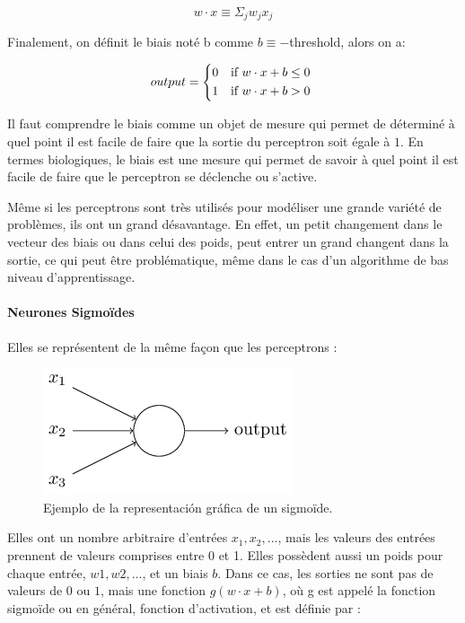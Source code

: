 \documentclass[conference,onecolumn]{IEEEtran}
\begin{document}
\begin{equation}
    w \cdot x \equiv \Sigma_j w_jx_j
\end{equation}

Finalement, on définit le biais noté b comme $b \equiv -$threshold, alors on a: 

\begin{equation}
    output =
    \begin{cases*}
      0 & if $w \cdot x + b \leq 0$ \\
      1 & if $w \cdot x + b > 0$ \\
    \end{cases*}
\end{equation}

Il faut comprendre le biais comme un objet de mesure qui permet de déterminé à quel point il est facile de faire que la sortie du perceptron soit égale à $1$. En termes biologiques, le biais est une mesure qui permet de savoir à quel point il est facile de faire que le perceptron se déclenche ou s’active. 

Même si les perceptrons sont très utilisés pour modéliser une grande variété de problèmes, ils ont un grand désavantage. En effet, un petit changement dans le vecteur des biais ou dans celui des poids, peut entrer un grand changent dans la sortie, ce qui peut être problématique, même dans le cas d’un algorithme de bas niveau d’apprentissage.
\hfill\\

\paragraph{Neurones Sigmoïdes}
Elles se représentent de la même façon que les perceptrons : 

 \begin{figure}[H]
 \centering
    \includegraphics[scale=0.5]{img9.png}
    \caption{Ejemplo de la representación gráfica de un sigmoïde.}
\end{figure}

Elles ont un nombre arbitraire d’entrées $x_1, x_2, ...$, mais les valeurs des entrées prennent de valeurs comprises entre 0 et 1. Elles possèdent aussi un poids pour chaque entrée, $w1, w2, ...$, et un biais $b$. Dans ce cas, les sorties ne sont pas de valeurs de $0$ ou $1$, mais une fonction $g(w\cdot x+b)$, où g est appelé la fonction sigmoïde ou en général, fonction d’activation, et est définie par : 
\end{document}
